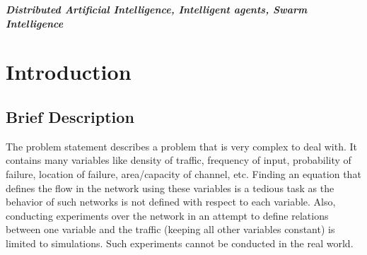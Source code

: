 \documentclass[twoside,a4paper,12pt]{book}
\begin{document}



{   \setlength{\parindent}{11mm} }
{ \setlength{\parindent}{0mm} }

\textbf{\emph{Distributed  Artificial Intelligence, Intelligent agents, Swarm Intelligence}}







\pagestyle{empty}
\bgroup
\makeatletter
\xpatchcmd{}
\tableofcontents
\makeatother
\egroup
{}

\pagestyle{clear}
\newpage



\listoffigures 

\newpage




\listoftables
\newpage


\pagestyle{clear}


\setlength{\parindent}{11mm}
\mainmatter
\chapter{Introduction}

\newpage

\section{Brief Description}
\pagestyle{plain}
The problem statement describes a problem that is very complex to deal with. It contains many variables like density of traffic, frequency of input, probability of failure, location of failure, area/capacity of channel, etc. Finding an equation that defines the flow in the network using these variables is a tedious task as the behavior of such networks is not defined with respect to each variable. Also, conducting experiments over the network in an attempt to define relations between one variable and the traffic (keeping all other variables constant) is limited to simulations. Such experiments cannot be conducted in the real world.\\
\end{document}
